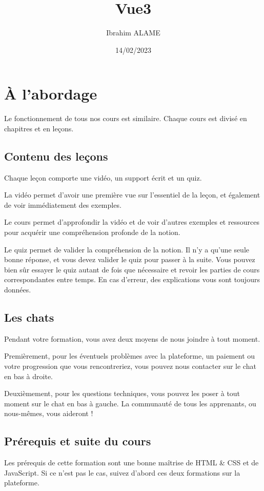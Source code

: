 \documentclass{article}
\title{Vue3}
\author{Ibrahim ALAME}
\date{14/02/2023}
\begin{document}
\maketitle

\section{À l'abordage}
Le fonctionnement de tous nos cours est similaire. Chaque cours est divisé en chapitres et en leçons.
\subsection{Contenu des leçons}
Chaque leçon comporte une vidéo, un support écrit et un quiz.

La vidéo permet d'avoir une première vue sur l'essentiel de la leçon, et également de voir immédiatement des exemples.

Le cours permet d'approfondir la vidéo et de voir d'autres exemples et ressources pour acquérir une compréhension profonde de la notion.

Le quiz permet de valider la compréhension de la notion. Il n'y a qu'une seule bonne réponse, et vous devez valider le quiz pour passer à la suite. Vous pouvez bien sûr essayer le quiz autant de fois que nécessaire et revoir les parties de cours correspondantes entre temps. En cas d'erreur, des explications vous sont toujours données.

\subsection{Les chats}
Pendant votre formation, vous avez deux moyens de nous joindre à tout moment.

Premièrement, pour les éventuels problèmes avec la plateforme, un paiement ou votre progression que vous rencontreriez, vous pouvez nous contacter sur le chat en bas à droite.

Deuxièmement, pour les questions techniques, vous pouvez les poser à tout moment sur le chat en bas à gauche. La communauté de tous les apprenants, ou nous-mêmes, vous aideront !

\subsection{Prérequis et suite du cours}
Les prérequis de cette formation sont une bonne maîtrise de HTML \& CSS et de JavaScript. Si ce n'est pas le cas, suivez d'abord ces deux formations sur la plateforme.
\end{document}
